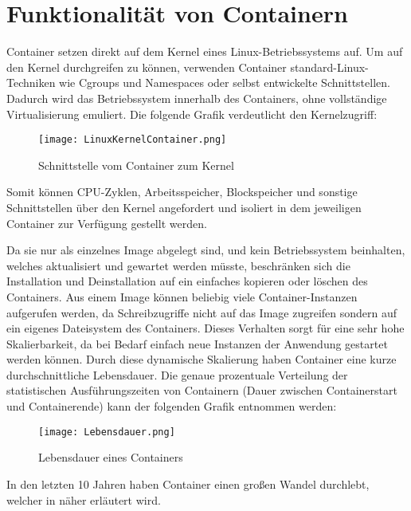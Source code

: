 \section{Funktionalität von Containern}
\label{sec:Funktionalität von Container}

Container setzen direkt auf dem Kernel eines Linux-Betriebssystems auf. Um auf den Kernel durchgreifen zu können, verwenden Container standard-Linux-Techniken wie Cgroups und Namespaces oder selbst entwickelte Schnittstellen. Dadurch wird das Betriebssystem innerhalb des Containers, ohne vollständige Virtualisierung emuliert. Die folgende Grafik verdeutlicht den Kernelzugriff:
\begin{figure}[H]
	\begin{center}
		\texttt{[image: LinuxKernelContainer.png]}
	\end{center}
	\caption[Schnittstelle vom Container zum Kernel]{Schnittstelle vom Container zum Kernel \footnotemark}
	\label{fig:HW1}
\end{figure}
Somit können CPU-Zyklen, Arbeitsspeicher, Blockspeicher und sonstige Schnittstellen über den Kernel angefordert und isoliert in dem jeweiligen Container zur Verfügung gestellt werden.\cite{DataCenter}

Da sie nur als einzelnes Image abgelegt sind, und kein Betriebssystem beinhalten, welches aktualisiert und gewartet werden müsste, beschränken sich die Installation und Deinstallation auf ein einfaches kopieren oder löschen des Containers. 
Aus einem Image können beliebig viele Container-Instanzen aufgerufen werden, da Schreibzugriffe nicht auf das Image zugreifen sondern auf ein eigenes Dateisystem des Containers. Dieses Verhalten sorgt für eine sehr hohe Skalierbarkeit, da bei Bedarf einfach neue Instanzen der Anwendung gestartet werden können.\cite{DevInsider} Durch diese dynamische Skalierung haben Container eine kurze durchschnittliche Lebensdauer. Die genaue prozentuale Verteilung der statistischen Ausführungszeiten von Containern (Dauer zwischen Containerstart und Containerende) kann der folgenden Grafik entnommen werden:
\begin{figure}[H]
	\begin{center}
		\texttt{[image: Lebensdauer.png]}
	\end{center}
	\caption[Lebensdauer eines Containers]{Lebensdauer eines Containers \footnotemark}
	\label{fig:HW1}
\end{figure}
In den letzten 10 Jahren haben Container einen großen Wandel durchlebt, welcher in  näher erläutert wird.
\newpage